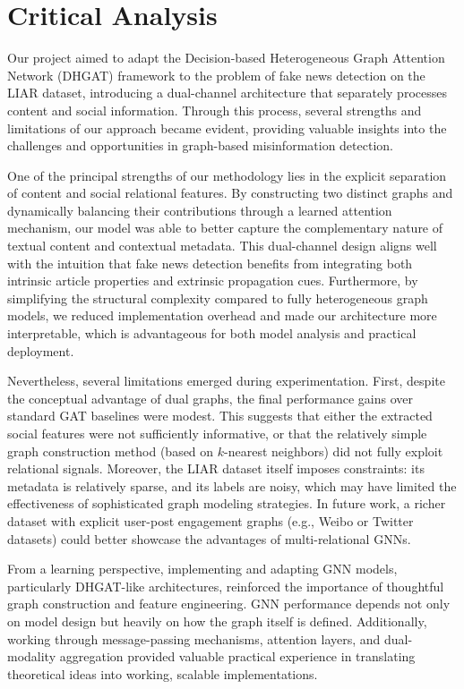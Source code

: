 \section{Critical Analysis}

Our project aimed to adapt the Decision-based Heterogeneous Graph Attention Network (DHGAT) framework to the problem of fake news detection on the LIAR dataset, introducing a dual-channel architecture that separately processes content and social information. Through this process, several strengths and limitations of our approach became evident, providing valuable insights into the challenges and opportunities in graph-based misinformation detection.

One of the principal strengths of our methodology lies in the explicit separation of content and social relational features. By constructing two distinct graphs and dynamically balancing their contributions through a learned attention mechanism, our model was able to better capture the complementary nature of textual content and contextual metadata. This dual-channel design aligns well with the intuition that fake news detection benefits from integrating both intrinsic article properties and extrinsic propagation cues. Furthermore, by simplifying the structural complexity compared to fully heterogeneous graph models, we reduced implementation overhead and made our architecture more interpretable, which is advantageous for both model analysis and practical deployment.

Nevertheless, several limitations emerged during experimentation. First, despite the conceptual advantage of dual graphs, the final performance gains over standard GAT baselines were modest. This suggests that either the extracted social features were not sufficiently informative, or that the relatively simple graph construction method (based on $k$-nearest neighbors) did not fully exploit relational signals. Moreover, the LIAR dataset itself imposes constraints: its metadata is relatively sparse, and its labels are noisy, which may have limited the effectiveness of sophisticated graph modeling strategies. In future work, a richer dataset with explicit user-post engagement graphs (e.g., Weibo or Twitter datasets) could better showcase the advantages of multi-relational GNNs.

From a learning perspective, implementing and adapting GNN models, particularly DHGAT-like architectures, reinforced the importance of thoughtful graph construction and feature engineering. GNN performance depends not only on model design but heavily on how the graph itself is defined. Additionally, working through message-passing mechanisms, attention layers, and dual-modality aggregation provided valuable practical experience in translating theoretical ideas into working, scalable implementations.

